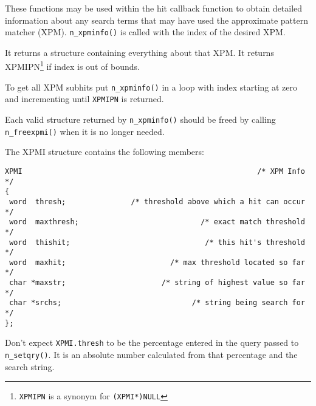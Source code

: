 \DESCRIPTION

These functions may be used within the hit callback function to obtain
detailed information about any search terms that may have used the
approximate pattern matcher (XPM).  \verb`n_xpminfo()` is called with
the index of the desired XPM.

It returns a structure containing everything about that XPM.  It returns
XPMIPN\footnote{\verb`XPMIPN` is a synonym for \verb`(XPMI*)NULL`} if
index is out of bounds.

To get all XPM subhits put \verb`n_xpminfo()` in a loop with index
starting at zero and incrementing until \verb`XPMIPN` is returned.

Each valid structure returned by \verb`n_xpminfo()` should be freed by
calling \verb`n_freexpmi()` when it is no longer needed.

The XPMI structure contains the following members:
\begin{verbatim}
XPMI                                                      /* XPM Info */
{
 word  thresh;               /* threshold above which a hit can occur */
 word  maxthresh;                            /* exact match threshold */
 word  thishit;                               /* this hit's threshold */
 word  maxhit;                        /* max threshold located so far */
 char *maxstr;                      /* string of highest value so far */
 char *srchs;                              /* string being search for */
};

\end{verbatim}

\CAVEATS

Don't expect \verb`XPMI.thresh` to be the percentage entered in the
query passed to \verb`n_setqry()`.  It is an absolute number calculated
from that percentage and the search string.

